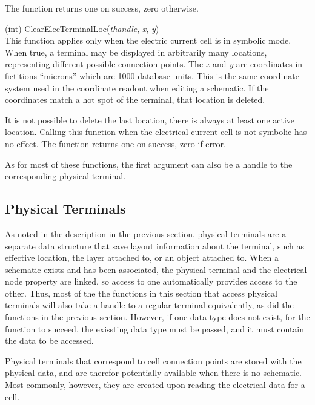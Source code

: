 \begin{description}
The function returns one on success, zero otherwise.

\item{(int) \vt ClearElecTerminalLoc({\it thandle\/}, {\it x\/}, {\it y\/})}\\
This function applies only when the electric current cell is in
symbolic mode.  When true, a terminal may be displayed in arbitrarily
many locations, representing different possible connection points. 
The {\it x} and {\it y} are coordinates in fictitions ``microns''
which are 1000 database units.  This is the same coordinate system
used in the coordinate readout when editing a schematic.  If the
coordinates match a hot spot of the terminal, that location is
deleted.

It is not possible to delete the last location, there is always at
least one active location.  Calling this function when the electrical
current cell is not symbolic has no effect.  The function returns one
on success, zero if error.

As for most of these functions, the first argument can also be a
handle to the corresponding physical terminal.
\end{description}


\subsection{Physical Terminals}

As noted in the description in the previous section, physical
terminals are a separate data structure that save layout information
about the terminal, such as effective location, the layer attached to,
or an object attached to.  When a schematic exists and has been
associated, the physical terminal and the electrical node property are
linked, so access to one automatically provides access to the other. 
Thus, most of the the functions in this section that access physical
terminals will also take a handle to a regular terminal equivalently,
as did the functions in the previous section.  However, if one data
type does not exist, for the function to succeed, the exissting data
type must be passed, and it must contain the data to be accessed.

Physical terminals that correspond to cell connection points are
stored with the physical data, and are therefor potentially available
when there is no schematic.  Most commonly, however, they are created
upon reading the electrical data for a cell.

